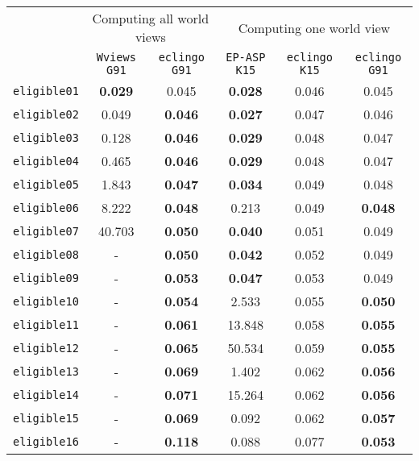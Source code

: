 \documentclass{new_tlp}
\begin{document}
\begin{table}[ht]
\begin{tabular}{c|cc|ccc}
\cline{1-6}
  & \multicolumn{2}{c|}{Computing all world views} & \multicolumn{3}{c}{Computing one world view} \\ \cline{1-6}
  & \texttt{Wviews G91} & \texttt{eclingo G91} & \texttt{EP-ASP K15} & \texttt{eclingo K15} & \texttt{eclingo G91} \\ \cline{1-6}
\texttt{eligible01} & \textbf{0.029}     & 0.045   & \textbf{0.028}    & 0.046    & 0.045    \\
\texttt{eligible02} & 0.049   & \textbf{0.046}   & \textbf{0.027}    & 0.047    & 0.046           \\
\texttt{eligible03} & 0.128   & \textbf{0.046}   & \textbf{0.029}    & 0.048    & 0.047           \\
\texttt{eligible04} & 0.465   & \textbf{0.046}   & \textbf{0.029}    & 0.048    & 0.047           \\
\texttt{eligible05} & 1.843   & \textbf{0.047}   & \textbf{0.034}    & 0.049    & 0.048           \\
\texttt{eligible06} & 8.222   & \textbf{0.048}   & 0.213             & 0.049    & \textbf{0.048}  \\
\texttt{eligible07} & 40.703  & \textbf{0.050}   & \textbf{0.040}    & 0.051    & 0.049           \\
\texttt{eligible08} & -       & \textbf{0.050}   & \textbf{0.042}    & 0.052    & 0.049           \\
\texttt{eligible09} & -       & \textbf{0.053}   & \textbf{0.047}    & 0.053    & 0.049           \\
\texttt{eligible10} & -       & \textbf{0.054}   & 2.533             & 0.055    & \textbf{0.050}  \\
\texttt{eligible11} & -       & \textbf{0.061}   & 13.848            & 0.058    & \textbf{0.055}  \\
\texttt{eligible12} & -       & \textbf{0.065}   & 50.534            & 0.059    & \textbf{0.055}  \\
\texttt{eligible13} & -       & \textbf{0.069}   & 1.402             & 0.062    & \textbf{0.056}  \\
\texttt{eligible14} & -       & \textbf{0.071}   & 15.264            & 0.062    & \textbf{0.056}  \\
\texttt{eligible15} & -       & \textbf{0.069}   & 0.092             & 0.062    & \textbf{0.057}  \\
\texttt{eligible16} & -       & \textbf{0.118}   & 0.088             & 0.077    & \textbf{0.053}  \\

\end{tabular}
\end{table}
\end{document}
